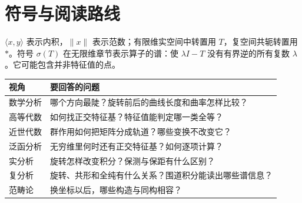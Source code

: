\documentclass[UTF8,a4paper]{ctexbook}
\begin{document}
\section{符号与阅读路线}

$\langle x,y\rangle$ 表示内积，$\|x\|$ 表示范数；有限维实空间中转置用 $T$，复空间共轭转置用 $*$。符号 $\sigma(T)$ 在无限维章节表示算子的谱：使 $\lambda I-T$ 没有有界逆的所有复数 $\lambda$。它可能包含并非特征值的点。

\begin{center}
\begin{tabular}{lp{}}
\toprule
视角 & 要回答的问题\\
\midrule
数学分析 & 哪个方向最陡？旋转前后的曲线长度和曲率怎样比较？\\
高等代数 & 如何找正交特征基？特征值能判定哪一类全等？\\
近世代数 & 群作用如何把矩阵分成轨道？哪些变换不改变它？\\
泛函分析 & 无穷维里何时还有正交特征基？如何逐项计算？\\
实分析 & 旋转怎样改变积分？保测与保距有什么区别？\\
复分析 & 旋转、共形和全纯有什么关系？围道积分能读出哪些谱信息？\\
范畴论 & 换坐标以后，哪些构造与同构相容？\\
\bottomrule
\end{tabular}
\end{center}

\mainmatter







\appendix

\end{document}
